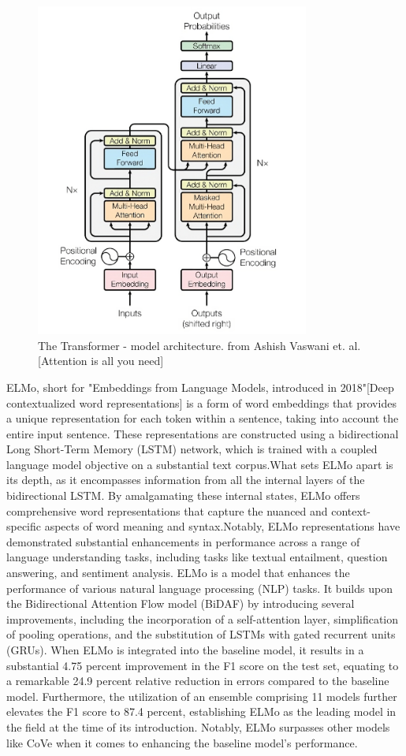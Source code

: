 \documentclass[conference]{IEEEtran}
\begin{document}
\begin{figure}[htp]
    \includegraphics[width=9cm]{transformer}
    \caption{The Transformer - model architecture. from Ashish Vaswani et. al. [Attention is all you need]}
    \label{fig:galaxy}
\end{figure}

ELMo, short for "Embeddings from Language Models, introduced in 2018"[Deep contextualized word representations] is a form of word embeddings that provides a unique representation for each token within a sentence, taking into account the entire input sentence. These representations are constructed using a bidirectional Long Short-Term Memory (LSTM) network, which is trained with a coupled language model objective on a substantial text corpus.What sets ELMo apart is its depth, as it encompasses information from all the internal layers of the bidirectional LSTM. By amalgamating these internal states, ELMo offers comprehensive word representations that capture the nuanced and context-specific aspects of word meaning and syntax.Notably, ELMo representations have demonstrated substantial enhancements in performance across a range of language understanding tasks, including tasks like textual entailment, question answering, and sentiment analysis.
ELMo is a model that enhances the performance of various natural language processing (NLP) tasks. It builds upon the Bidirectional Attention Flow model (BiDAF) by introducing several improvements, including the incorporation of a self-attention layer, simplification of pooling operations, and the substitution of LSTMs with gated recurrent units (GRUs). When ELMo is integrated into the baseline model, it results in a substantial 4.75 percent improvement in the F1 score on the test set, equating to a remarkable 24.9 percent relative reduction in errors compared to the baseline model. Furthermore, the utilization of an ensemble comprising 11 models further elevates the F1 score to 87.4 percent, establishing ELMo as the leading model in the field at the time of its introduction. Notably, ELMo surpasses other models like CoVe when it comes to enhancing the baseline model's performance.
\end{document}
